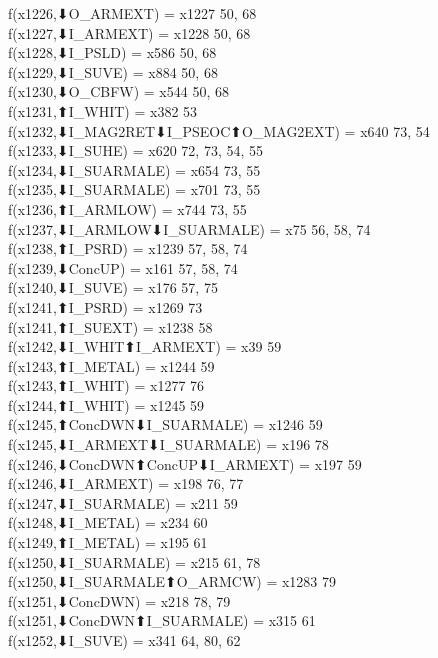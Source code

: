 f(x1226,⬇O_ARMEXT) = x1227 {50, 68} \\
f(x1227,⬇I_ARMEXT) = x1228 {50, 68} \\
f(x1228,⬇I_PSLD) = x586 {50, 68} \\
f(x1229,⬇I_SUVE) = x884 {50, 68} \\
f(x1230,⬇O_CBFW) = x544 {50, 68} \\
f(x1231,⬆I_WHIT) = x382 {53} \\
f(x1232,⬇I_MAG2RET⬇I_PSEOC⬆O_MAG2EXT) = x640 {73, 54} \\
f(x1233,⬇I_SUHE) = x620 {72, 73, 54, 55} \\
f(x1234,⬇I_SUARMALE) = x654 {73, 55} \\
f(x1235,⬇I_SUARMALE) = x701 {73, 55} \\
f(x1236,⬆I_ARMLOW) = x744 {73, 55} \\
f(x1237,⬇I_ARMLOW⬇I_SUARMALE) = x75 {56, 58, 74} \\
f(x1238,⬆I_PSRD) = x1239 {57, 58, 74} \\
f(x1239,⬇ConcUP) = x161 {57, 58, 74} \\
f(x1240,⬇I_SUVE) = x176 {57, 75} \\
f(x1241,⬆I_PSRD) = x1269 {73} \\
f(x1241,⬆I_SUEXT) = x1238 {58} \\
f(x1242,⬇I_WHIT⬆I_ARMEXT) = x39 {59} \\
f(x1243,⬆I_METAL) = x1244 {59} \\
f(x1243,⬆I_WHIT) = x1277 {76} \\
f(x1244,⬆I_WHIT) = x1245 {59} \\
f(x1245,⬆ConcDWN⬇I_SUARMALE) = x1246 {59} \\
f(x1245,⬇I_ARMEXT⬇I_SUARMALE) = x196 {78} \\
f(x1246,⬇ConcDWN⬆ConcUP⬇I_ARMEXT) = x197 {59} \\
f(x1246,⬇I_ARMEXT) = x198 {76, 77} \\
f(x1247,⬇I_SUARMALE) = x211 {59} \\
f(x1248,⬇I_METAL) = x234 {60} \\
f(x1249,⬆I_METAL) = x195 {61} \\
f(x1250,⬇I_SUARMALE) = x215 {61, 78} \\
f(x1250,⬇I_SUARMALE⬆O_ARMCW) = x1283 {79} \\
f(x1251,⬇ConcDWN) = x218 {78, 79} \\
f(x1251,⬇ConcDWN⬆I_SUARMALE) = x315 {61} \\
f(x1252,⬇I_SUVE) = x341 {64, 80, 62} \\
